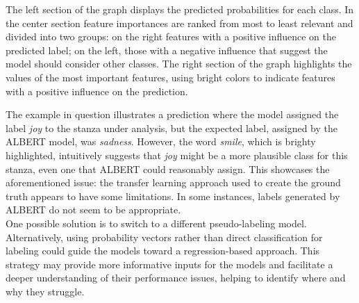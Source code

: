 The left section of the graph displays the
predicted probabilities for each class. In the center section
feature importances are ranked from most to least relevant and divided into two
groups: on the right
features with a positive influence on the predicted label; on the left, those
with a negative influence that suggest the model should consider other classes.
The right section of the graph highlights the values of the most important
features, using bright colors to indicate features with a positive influence on the
prediction.

The example in question illustrates a prediction where the model assigned the label \textit{joy} to the stanza under analysis, but the expected label, assigned by the ALBERT model, was \textit{sadness}.
However, the word \textit{smile}, which is brighty highlighted, intuitively suggests that \textit{joy} might be a more plausible class for this stanza, even one that ALBERT could reasonably assign. 
This showcases the aforementioned issue: the transfer learning approach used to
create the ground truth appears to have some limitations. In some instances, labels
generated by ALBERT do not seem to be appropriate.\\

One possible solution is to switch to a different pseudo-labeling model.
Alternatively, using probability vectors rather than direct classification for
labeling could guide the models toward a regression-based approach. This strategy
may provide more informative inputs for the models and facilitate a deeper
understanding of their performance issues, helping to identify where and why they
struggle.


